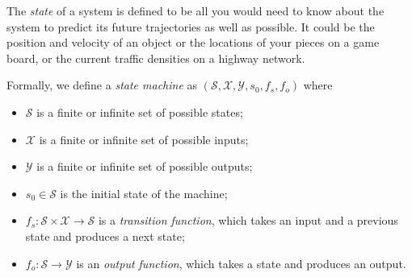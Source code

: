 The {\em state} of a system is defined to be all you would need to
know about the system to predict its future trajectories as well as
possible.  It could be the position and velocity of an object or the
locations of your pieces on a game board, or the current traffic
densities on a highway network.

Formally, we define a {\em state machine} as
$(\mathcal{S}, \mathcal{X}, \mathcal{Y}, s_0, f_s, f_o)$
where
\begin{itemize}
  \item $\mathcal{S}$ is a finite or infinite set of possible states;
  \item $\mathcal{X}$ is a finite  or infinite  set of possible inputs;
  \item $\mathcal{Y}$ is a finite or infinite set of possible outputs;
  \item $s_0 \in \mathcal{S}$ is the initial state of the machine;
  \item $f_s: \mathcal{S} \times \mathcal{X} \rightarrow \mathcal{S}$ is a
          {\em transition function}, which takes an
        input and a previous state and produces a next state;
  \item $f_o: \mathcal{S} \rightarrow \mathcal{Y}$ is an {\em output
            function}, which takes a state and produces
        an output.
\end{itemize}

